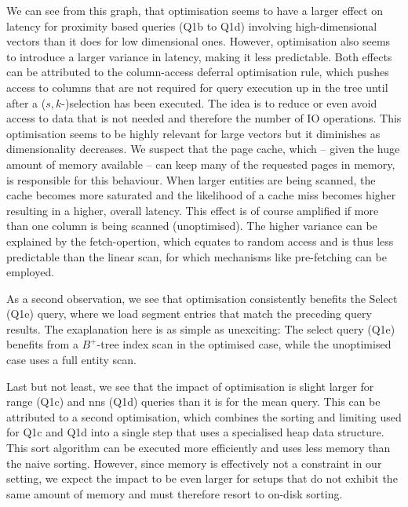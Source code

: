 We can see from this graph, that optimisation seems to have a larger effect on latency for proximity based queries (Q1b to Q1d) involving high-dimensional vectors than it does for low dimensional ones. However, optimisation also seems to introduce a larger variance in latency, making it less predictable. Both effects can be attributed to the column-access deferral optimisation rule, which pushes access to columns that are not required for query execution up in the tree until after a ($s,k$-)selection has been executed. The idea is to reduce or even avoid access to data that is not needed and therefore the number of IO operations. This optimisation seems to be highly relevant for large vectors but it diminishes as dimensionality decreases. We suspect that the page cache, which -- given the huge amount of memory available -- can keep many of the requested pages in memory, is responsible for this behaviour. When larger entities are being scanned, the cache becomes more saturated and the likelihood of a cache miss becomes higher resulting in a higher, overall latency. This effect is of course amplified if more than one column is being scanned (unoptimised). The higher variance can be explained by the fetch-opertion, which equates to random access and is thus less predictable than the linear scan, for which mechanisms like pre-fetching can be employed.

As a second observation, we see that optimisation consistently benefits the Select (Q1e) query, where we load segment entries that match the preceding query results. The exaplanation here is as simple as unexciting: The select query (Q1e) benefits from a $B^{+}$-tree index scan in the optimised case, while the unoptimised case uses a full entity scan.
 
Last but not least, we see that the impact of optimisation is slight larger for range (Q1c) and \acrshort{nns} (Q1d) queries than it is for the mean query. This can be attributed to a second optimisation, which combines the sorting and limiting used for Q1c and Q1d into a single step that uses a specialised heap data structure. This sort algorithm can be executed more efficiently and uses less memory than the naive sorting. However, since memory is effectively not a constraint in our setting, we expect the impact to be even larger for setups that do not exhibit the same amount of memory and must therefore resort to on-disk sorting.

\newpage

